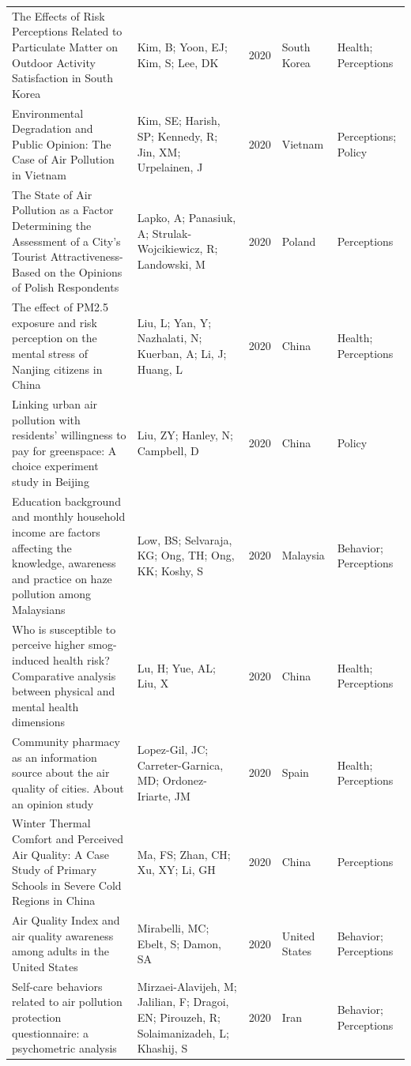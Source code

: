 {\begin{longtable}[t]{p{6cm}p{3cm}lp{3cm}p{3cm}}
\addlinespace
The Effects of Risk Perceptions Related to Particulate Matter on Outdoor Activity Satisfaction in South Korea & Kim, B; Yoon, EJ; Kim, S; Lee, DK & 2020 & South Korea & Health; Perceptions\\
Environmental Degradation and Public Opinion: The Case of Air Pollution in Vietnam & Kim, SE; Harish, SP; Kennedy, R; Jin, XM; Urpelainen, J & 2020 & Vietnam & Perceptions; Policy\\
The State of Air Pollution as a Factor Determining the Assessment of a City's Tourist Attractiveness-Based on the Opinions of Polish Respondents & Lapko, A; Panasiuk, A; Strulak-Wojcikiewicz, R; Landowski, M & 2020 & Poland & Perceptions\\
The effect of PM2.5 exposure and risk perception on the mental stress of Nanjing citizens in China & Liu, L; Yan, Y; Nazhalati, N; Kuerban, A; Li, J; Huang, L & 2020 & China & Health; Perceptions\\
Linking urban air pollution with residents' willingness to pay for greenspace: A choice experiment study in Beijing & Liu, ZY; Hanley, N; Campbell, D & 2020 & China & Policy\\
\addlinespace
Education background and monthly household income are factors affecting the knowledge, awareness and practice on haze pollution among Malaysians & Low, BS; Selvaraja, KG; Ong, TH; Ong, KK; Koshy, S & 2020 & Malaysia & Behavior; Perceptions\\
Who is susceptible to perceive higher smog-induced health risk? Comparative analysis between physical and mental health dimensions & Lu, H; Yue, AL; Liu, X & 2020 & China & Health; Perceptions\\
Community pharmacy as an information source about the air quality of cities. About an opinion study & Lopez-Gil, JC; Carreter-Garnica, MD; Ordonez-Iriarte, JM & 2020 & Spain & Health; Perceptions\\
Winter Thermal Comfort and Perceived Air Quality: A Case Study of Primary Schools in Severe Cold Regions in China & Ma, FS; Zhan, CH; Xu, XY; Li, GH & 2020 & China & Perceptions\\
Air Quality Index and air quality awareness among adults in the United States & Mirabelli, MC; Ebelt, S; Damon, SA & 2020 & United States & Behavior; Perceptions\\
\addlinespace
Self-care behaviors related to air pollution protection questionnaire: a psychometric analysis & Mirzaei-Alavijeh, M; Jalilian, F; Dragoi, EN; Pirouzeh, R; Solaimanizadeh, L; Khashij, S & 2020 & Iran & Behavior; Perceptions\\

\end{longtable}}
